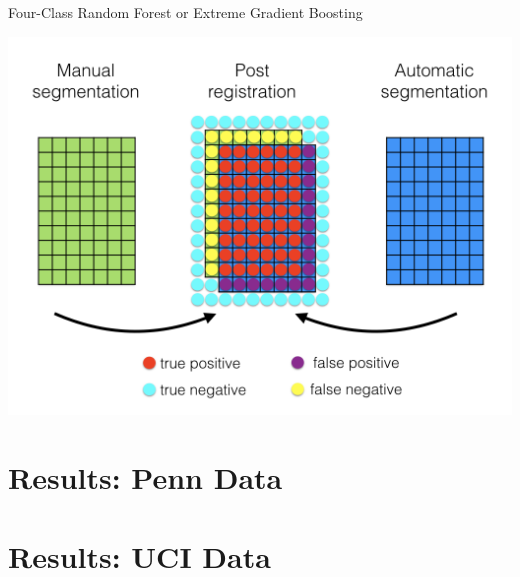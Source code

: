 \documentclass[ignorenonframetext,]{beamer}
\begin{document}
\begin{frame}{Four-Class Random Forest or Extreme Gradient Boosting}

\centering
\includegraphics[width=0.85 \textwidth]{../Figures/correctiveLearning003.png}

\end{frame}

\section{Results: Penn Data}\label{results-penn-data}

\section*{Results: UCI Data}\label{results-uci-data}

\hypertarget{refs}{}
\end{document}
